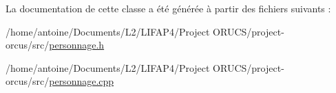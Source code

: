 La documentation de cette classe a été générée à partir des fichiers suivants \+:\begin{DoxyCompactItemize}
\item 
/home/antoine/\+Documents/\+L2/\+L\+I\+F\+A\+P4/\+Project O\+R\+U\+C\+S/project-\/orcus/src/\hyperlink{personnage_8h}{personnage.\+h}\item 
/home/antoine/\+Documents/\+L2/\+L\+I\+F\+A\+P4/\+Project O\+R\+U\+C\+S/project-\/orcus/src/\hyperlink{personnage_8cpp}{personnage.\+cpp}\end{DoxyCompactItemize}
